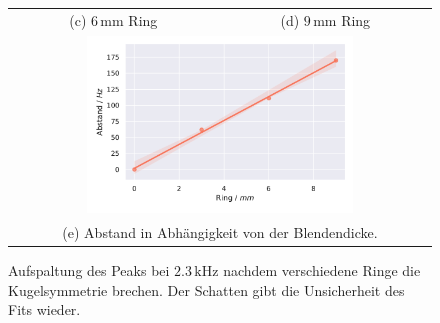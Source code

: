 \begin{figure}[H]
\begin{tabular}{cc}
  (c)  $6 \,\si{\milli\metre}$ Ring & (d)  $9 \,\si{\milli\metre}$ Ring \\[6pt]
  \multicolumn{2}{c}{\includegraphics[width=0.65\textwidth]{Daten/Wasserstoff/spaltGesamt.pdf}}\\[6pt]
  \multicolumn{2}{c}{(e) Abstand in Abhängigkeit von der Blendendicke.}
  \end{tabular}
  \caption{Aufspaltung des Peaks bei $2.3 \,\si{\kilo\hertz}$ nachdem verschiedene Ringe die Kugelsymmetrie brechen. Der Schatten gibt die Unsicherheit des Fits wieder. } 
  \label{fig:hspalt}
\end{figure}
